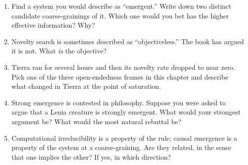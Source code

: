 \begin{enumerate}
  \item Find a system you would describe as ``emergent.'' Write down two
    distinct candidate coarse-grainings of it. Which one would you bet
    has the higher effective information? Why?
  \item Novelty search is sometimes described as ``objectiveless.'' The
    book has argued it is not. What \emph{is} the objective?
  \item Tierra ran for several hours and then its novelty rate dropped
    to near zero. Pick one of the three open-endedness frames in this
    chapter and describe what changed in Tierra at the point of
    saturation.
  \item Strong emergence is contested in philosophy. Suppose you were
    asked to argue that a Lenia creature is strongly emergent. What
    would your strongest argument be? What would the most natural
    rebuttal be?
  \item Computational irreducibility is a property of the rule; causal
    emergence is a property of the system at a coarse-graining. Are
    they related, in the sense that one implies the other? If yes, in
    which direction?
\end{enumerate}
